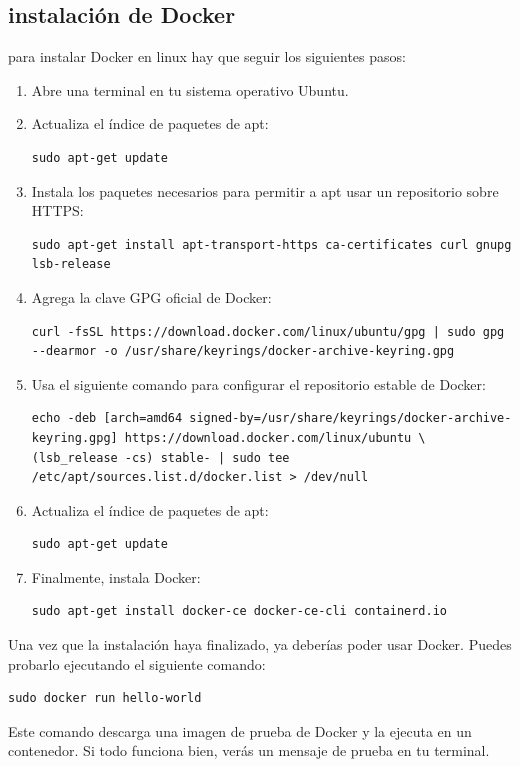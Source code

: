 \documentclass{article}
\begin{document}
 \subsection{instalación de Docker}
 para instalar Docker en linux hay que seguir los siguientes pasos:
 \begin{enumerate}
     \item Abre una terminal en tu sistema operativo Ubuntu.
     \item Actualiza el índice de paquetes de apt:
     \begin{lstlisting}[numbers=none]
         sudo apt-get update\end{lstlisting}
     \item Instala los paquetes necesarios para permitir a apt usar un repositorio sobre HTTPS:
\begin{lstlisting}[numbers=none]
 sudo apt-get install apt-transport-https ca-certificates curl gnupg lsb-release \end{lstlisting}
     \item Agrega la clave GPG oficial de Docker:
\begin{lstlisting}[numbers=none]
curl -fsSL https://download.docker.com/linux/ubuntu/gpg | sudo gpg --dearmor -o /usr/share/keyrings/docker-archive-keyring.gpg   \end{lstlisting}
     \item Usa el siguiente comando para configurar el repositorio estable de Docker:
 \begin{lstlisting}[numbers=none]
 echo -deb [arch=amd64 signed-by=/usr/share/keyrings/docker-archive-keyring.gpg] https://download.docker.com/linux/ubuntu \
(lsb_release -cs) stable- | sudo tee /etc/apt/sources.list.d/docker.list > /dev/null\end{lstlisting}
     \item Actualiza el índice de paquetes de apt:
 \begin{lstlisting}[numbers=none]
 sudo apt-get update\end{lstlisting}
 \item Finalmente, instala Docker:
 \begin{lstlisting}[numbers=none]
 sudo apt-get install docker-ce docker-ce-cli containerd.io    \end{lstlisting}
\end{enumerate}
Una vez que la instalación haya finalizado, ya deberías poder usar Docker. Puedes probarlo ejecutando el siguiente comando:
 \begin{lstlisting}[numbers=none]
    sudo docker run hello-world\end{lstlisting}
Este comando descarga una imagen de prueba de Docker y la ejecuta en un contenedor. Si todo funciona bien, verás un mensaje de prueba en tu terminal.\\
\end{document}
